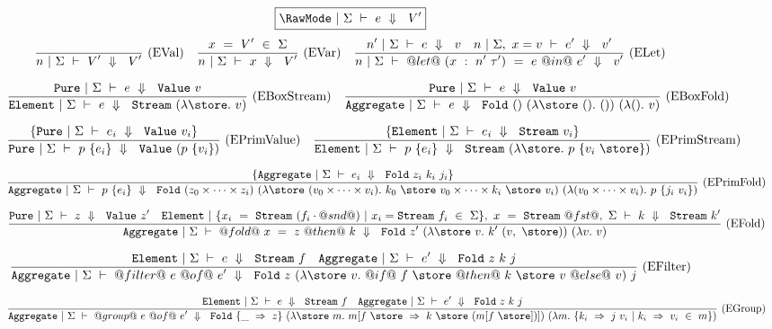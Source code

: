 
\begin{figure*}

$$
\boxed{\SourceStepX{\RawMode}{\Sigma}{e}{V'}}
$$
$$
\enskip \frac {\displaystyle } {\displaystyle 
    n~|~\Sigma~\vdash~V'~\Downarrow~~V'
} \  \mbox{(EVal)} \enskip
\enskip \frac {\displaystyle 
    x~=~V'~\in~\Sigma
} {\displaystyle 
    n~|~\Sigma~\vdash~x~\Downarrow~~V'
} \  \mbox{(EVar)} \enskip
\enskip \frac {\displaystyle 
  n'~|~\Sigma~\vdash~e~\Downarrow~~v
  \quad
  n~|~\Sigma,~x=v~\vdash~e'~\Downarrow~~v'
} {\displaystyle 
  n~|~\Sigma~\vdash~@let@~(x~:~n'~\tau')~=~e~@in@~e'~\Downarrow~~v'
} \  \mbox{(ELet)} \enskip
$$

$$
\ruleIN
{
    \SourceStepXP{\Sigma}{e}{\VValue{v}}
}
{
    \SourceStepXE{\Sigma}{e}{\VStream{(\lam{\store} v)}}
}{EBoxStream}
\ruleIN
{
    \SourceStepXP{\Sigma}{e}{\VValue{v}}
}
{
    \SourceStepXA{\Sigma}{e}{\VFold{()}{(\lam{\store~()} ())}{(\lam{()} v)}}
}{EBoxFold}
$$

$$
\ruleIN
{
  \{ \SourceStepXP{\Sigma}{e_i}{\VValue{v_i}} \}
}
{
  \SourceStepXP
    {\Sigma}
    {p~\{ e_i \} }
    {\VValue{(p~\{v_i\})}}
}{EPrimValue}
\ruleIN
{
  \{ \SourceStepXE{\Sigma}{e_i}{\VStream{v_i}} \}
}
{
  \SourceStepXE
    {\Sigma}
    {p~\{ e_i \} }
    {\VStream{(\lam{\store} p~\{v_i~\store\})}}
}{EPrimStream}
$$

$$
\ruleIN
{
  \{ \SourceStepXA{\Sigma}{e_i}{\VFold{z_i}{k_i}{j_i}} \}
}
{
  \SourceStepXA{\Sigma}
    {p~\{ e_i \} }
    {\VFold
      {(z_0 \times \cdots \times z_i)}
      {(\lam{\store~(v_0 \times \cdots \times v_i)}
        k_0~\store~v_0 \times \cdots \times k_i~\store~v_i)}
      {(\lam{(v_0 \times \cdots \times v_i)}
        p~\{j_i~v_i\})}}
}{EPrimFold}
$$

$$
\ruleIN
{
  \SourceStepXP{\Sigma}{z}{\VValue{z'}}
  \quad
  \SourceStepXE{\{x_i~=~\VStream{(f_i \cdot @snd@)}~|~x_i=\VStream{f_i}~\in~\Sigma\},~x~=~\VStream{@fst@},~\Sigma}{k}{\VStream{k'}}
}
{
  \SourceStepXA{\Sigma}
    {@fold@~x~=~z~@then@~k}
    {\VFold
      {z'}
      {(\lam{\store~v} k'~(v,~\store))}
      {(\lam{v} v)}}
}{EFold}
$$

$$
\ruleIN
{
  \SourceStepXE{\Sigma}{e}{\VStream{f}}
  \quad
  \SourceStepXA{\Sigma}{e'}{\VFold{z}{k}{j}}
}
{
  \SourceStepXA{\Sigma}
    {@filter@~e~@of@~e'}
    {\VFold
      {z}
      {(\lam{\store~v}
         @if@~f~\store~@then@~k~\store~v~@else@~v)}
      {j}}
}{EFilter}
$$

$$
\ruleIN
{
  \SourceStepXE{\Sigma}{e}{\VStream{f}}
  \quad
  \SourceStepXA{\Sigma}{e'}{\VFold{z}{k}{j}}
}
{
  \SourceStepXA{\Sigma}
    {@group@~e~@of@~e'}
    {\VFold
      {\{\_~\Rightarrow~z\}}
      {(\lam{\store~m}
        m[f~\store~\Rightarrow~k~\store~(m[f~\store])])}
      {(\lam{m}
        \{k_i~\Rightarrow~j~v_i~|~k_i~\Rightarrow~v_i~\in~m\})}}
}{EGroup}
$$


\end{figure*}
